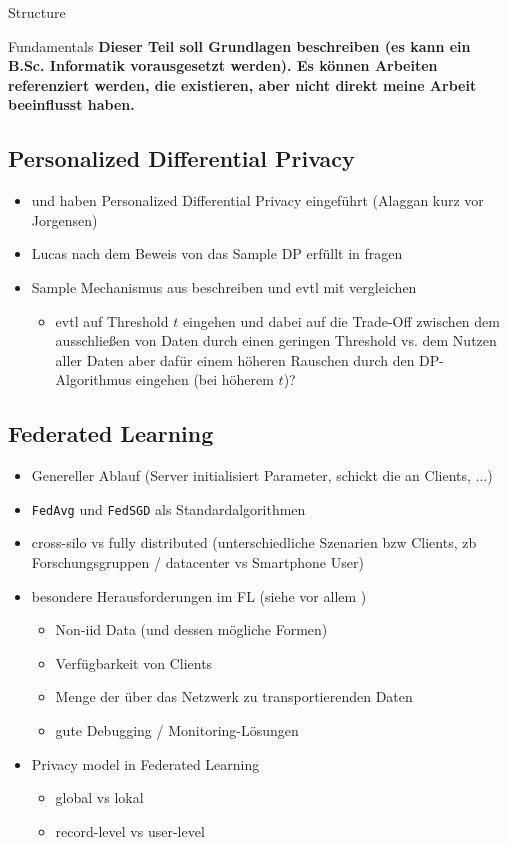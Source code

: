 \begin{chapter}{Structure}
	\begin{section}{Fundamentals}
		\textbf{Dieser Teil soll Grundlagen beschreiben (es kann ein B.Sc. Informatik vorausgesetzt werden). Es können Arbeiten referenziert werden, die existieren, aber nicht direkt meine Arbeit beeinflusst haben.}
		
		\subsection{Personalized Differential Privacy}
		\begin{itemize}
			\item \cite{alaggan:2016} und \cite{jorgensen:2015} haben Personalized Differential Privacy eingeführt (Alaggan kurz vor Jorgensen)
			\item Lucas nach dem Beweis von das Sample DP erfüllt in \cite{jorgensen:2015} fragen
			\item Sample Mechanismus aus \cite{jorgensen:2015} beschreiben und evtl mit \cite{boenisch:2023} vergleichen
			\begin{itemize}
				\item evtl auf Threshold $t$ eingehen und dabei auf die Trade-Off zwischen dem ausschließen von Daten durch einen geringen Threshold vs. dem Nutzen aller Daten aber dafür einem höheren Rauschen durch den DP-Algorithmus eingehen (bei höherem $t$)?
			\end{itemize}
		\end{itemize}
		
		\subsection{Federated Learning}
		\begin{itemize}
			\item Genereller Ablauf (Server initialisiert Parameter, schickt die an Clients, ...)
			\item \texttt{FedAvg} und \texttt{FedSGD} als Standardalgorithmen
			\item cross-silo vs fully distributed (unterschiedliche Szenarien bzw Clients, zb Forschungsgruppen / datacenter vs Smartphone User)
			\item besondere Herausforderungen im FL (siehe vor allem \cite{kairouz:2021})
			\begin{itemize}
				\item Non-iid Data (und dessen mögliche Formen)
				\item Verfügbarkeit von Clients
				\item Menge der über das Netzwerk zu transportierenden Daten
				\item gute Debugging / Monitoring-Lösungen
			\end{itemize}
			\item Privacy model in Federated Learning
			\begin{itemize}
				\item global vs lokal
				\item record-level vs user-level
			\end{itemize}
		\end{itemize}
		

\end{section}
\end{chapter}
